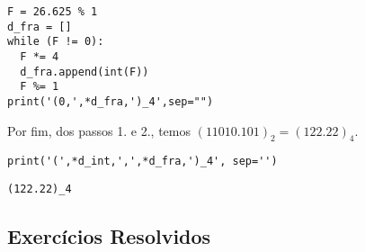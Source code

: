 \begin{ex}
\begin{enumerate}[1.]
\begin{lstlisting}
F = 26.625 % 1
d_fra = []
while (F != 0):
  F *= 4
  d_fra.append(int(F))
  F %= 1
print('(0,',*d_fra,')_4',sep="")
\end{lstlisting}
  \end{enumerate}

  Por fim, dos passos 1. e 2., temos $(11010.101)_2 = (122.22)_4$.

\begin{lstlisting}
print('(',*d_int,',',*d_fra,')_4', sep='')
\end{lstlisting}

\begin{verbatim}
(122.22)_4
\end{verbatim}
\end{ex}

\subsection{Exercícios Resolvidos}

